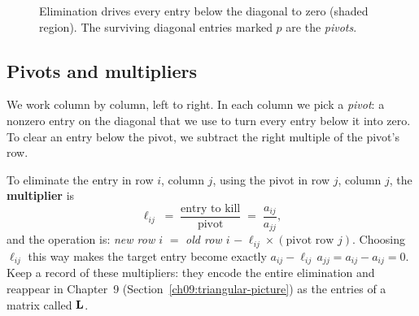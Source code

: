 \begin{figure}[H]
\centering
{}
\caption{Elimination drives every entry below the diagonal to zero (shaded
region). The surviving diagonal entries marked $p$ are the \emph{pivots}.}
\label{ch07:triangle}
\end{figure}

\subsection{Pivots and multipliers}

We work column by column, left to right. In each
column we pick a \emph{pivot}: a nonzero entry on the diagonal that we use to
turn every entry below it into zero. To clear an entry below the pivot, we subtract the right
multiple of the pivot's row.

\begin{focusbox}
To eliminate the entry in row $i$, column $j$, using the pivot in row $j$,
column $j$, the \textbf{multiplier} is
\[
\ell_{ij} \;=\; \frac{\text{entry to kill}}{\text{pivot}}
\;=\; \frac{a_{ij}}{a_{jj}},
\]
and the operation is: \emph{new row $i$} $=$ \emph{old row $i$}
$-\;\ell_{ij}\times(\text{pivot row } j)$. Choosing $\ell_{ij}$ this way makes
the target entry become exactly $a_{ij} - \ell_{ij}\,a_{jj} = a_{ij} - a_{ij} =
0$. Keep a record of these multipliers: they encode the entire elimination and
reappear in Chapter~9 (Section~\ref{ch09:triangular-picture}) as the entries of
a matrix called $\mathbf{L}$.
\end{focusbox}

